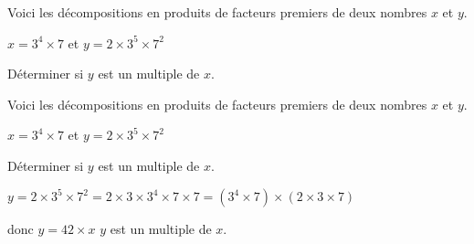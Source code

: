 \begin{exercice*}
    Voici les décompositions en produits de facteurs premiers de deux nombres $x$ et $y$.

    $x=3^4\times 7$ et $y=2\times 3^5\times 7^2$

    \smallskip
    Déterminer si $y$ est un multiple de $x$.
\end{exercice*}
\begin{corrige}
    Voici les décompositions en produits de facteurs premiers de deux nombres $x$ et $y$.

    $x=3^4\times 7$ et $y=2\times 3^5\times 7^2$

    \smallskip
    Déterminer si $y$ est un multiple de $x$.

    $y=2\times 3^5\times 7^2 = 2\times 3\times 3^4\times 7\times 7 = (3^4\times 7)\times (2\times 3\times 7)$

    donc $y=42\times x$ $y$ est un multiple de $x$.
\end{corrige}

